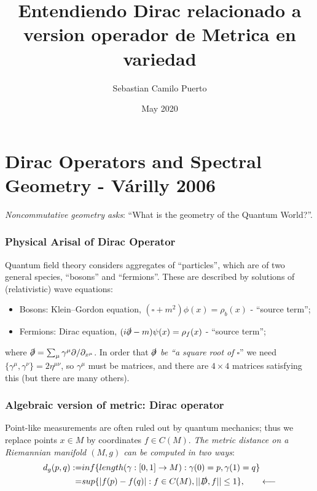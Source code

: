 \documentclass{article}
\title{Entendiendo Dirac relacionado a version operador de Metrica en variedad}
\author{Sebastian Camilo Puerto}
\date{May 2020}
\begin{document}
\maketitle

\section{Dirac Operators and Spectral Geometry - V\'arilly 2006}

\emph{Noncommutative geometry asks}: “What is the geometry of the Quantum World?”.

\subsubsection*{Physical Arisal of Dirac Operator}

Quantum field theory considers aggregates of “particles”, which are of two general species, “bosons” and “fermions”. These are described by solutions of (relativistic) wave equations:
    \begin{itemize}
        \item Bosons: Klein–Gordon equation, $(\square + m^2)\phi(x) = \rho_b(x)$ - “source term”;
        \item Fermions: Dirac equation, $(i\slashed\partial - m)\psi(x) = \rho_f (x)$ - “source term”;
    \end{itemize}

where $\slashed\partial = \sum_\mu \gamma^\mu \partial/\partial_{x^\mu}$. In order that \emph{$\slashed \partial$ be ``a square root of $\square$}'' we need $\{ \gamma^\mu, \gamma^\nu \} = 2 \eta^{\mu \nu}$, so $\gamma^\mu$ must be matrices, and there are $4 \times 4$ matrices satisfying this (but there are many others).

\subsubsection*{Algebraic version of metric: Dirac operator}

Point-like measurements are often ruled out by quantum mechanics; thus we replace points
$x \in M$ by coordinates $f \in C(M)$. \emph{The metric distance on a Riemannian manifold $(M, g)$ can be computed in two ways}:
\begin{align*}
    d_g(p, q) := & inf\{ length(\gamma : [0, 1] \to M) : \gamma(0) = p, \gamma(1) = q \} \\
              = & sup\{ |f(p) - f(q)| : f \in C(M), ||\slashed D, f|| \leq 1 \}, \qquad \longleftarrow    
\end{align*}
\end{document}

